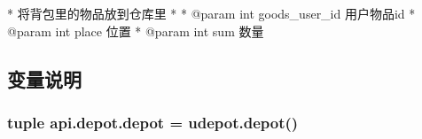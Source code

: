 \begin{DoxyVerb} * 将背包里的物品放到仓库里
 * 
 * @param int goods_user_id 用户物品id
 * @param int place 位置
 * @param int sum 数量\end{DoxyVerb}
 

\subsection{变量说明}
\hypertarget{namespaceapi_1_1depot_a5f505b41d9440b584d32e3aa18d3dbd5}{
\subsubsection[{depot}]{\setlength{\rightskip}{0pt plus 5cm}tuple api.\-depot.\-depot = udepot.\-depot()}}\label{namespaceapi_1_1depot_a5f505b41d9440b584d32e3aa18d3dbd5}
